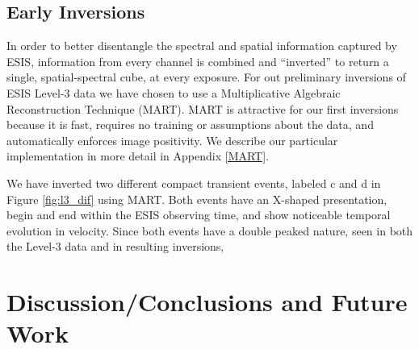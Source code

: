     
    
    
    \subsection{Early Inversions}
    	In order to better disentangle the spectral and spatial information captured by ESIS, information from every channel is combined and ``inverted'' to return a single, spatial-spectral cube, at every exposure.
    	For out preliminary inversions of ESIS Level-3 data we have chosen to use a Multiplicative Algebraic Reconstruction Technique (MART).
    	MART is attractive for our first inversions because it is fast, requires no training or assumptions about the data, and automatically enforces image  positivity.
    	We describe our particular implementation in more detail in Appendix \ref{MART}.
    	
    	\begin{figure}[htb!]
    		\centering
    		\caption{}
    		\label{fig:perfect_x_inverted}
    	\end{figure}
    	
    	We have inverted two different compact transient events, labeled c and d in Figure \ref{fig:l3_dif} using MART.
    	Both events have an X-shaped presentation, begin and end within the ESIS observing time, and show noticeable temporal evolution in velocity.
    	Since both events have a double peaked nature, seen in both the Level-3 data and in resulting inversions, 
    	
    
    	
    	
    			
    		   	
    	
\section{Discussion/Conclusions and Future Work}





